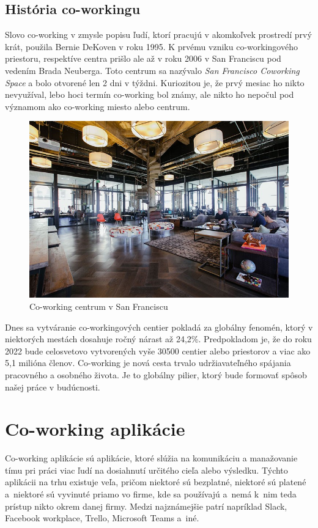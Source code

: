 \subsection{História co-workingu}
\indent Slovo co-working v zmysle popisu ľudí, ktorí pracujú v akomkoľvek prostredí prvý krát, použila Bernie DeKoven v roku 1995. K prvému vzniku co-workingového priestoru, respektíve centra prišlo ale až v roku 2006 v San Franciscu pod vedením Brada Neuberga. Toto centrum sa nazývalo \textit{San Francisco Coworking Space} a bolo otvorené len 2 dni v týždni. Kuriozitou je, že prvý mesiac ho nikto nevyužíval, lebo hoci termín co-working bol známy, ale nikto ho nepočul pod významom ako co-working miesto alebo centrum. 

\begin{figure}[H]
    \centering
    \includegraphics[scale=0.50]{img/coworking_space.jpg}
    \caption{Co-working centrum v San Franciscu}
    \label{fig:img-co-space}
\end{figure}

\indent Dnes sa vytváranie co-workingových centier pokladá za globálny fenomén, ktorý v niektorých mestách dosahuje ročný nárast až 24,2\%. Predpokladom je, že do roku 2022 bude celosvetovo vytvorených vyše 30500 centier alebo priestorov a viac ako 5,1 milióna členov. Co-working je nová cesta trvalo udržiavateľného spájania pracovného a osobného života. Je to globálny pilier, ktorý bude formovať spôsob našej práce v budúcnosti. 

\section{Co-working aplikácie}
\indent Co-working aplikácie sú aplikácie, ktoré slúžia na komunikáciu a manažovanie tímu pri práci viac ľudí na dosiahnutí určitého cieľa alebo výsledku. Týchto aplikácii na trhu existuje veľa, pričom niektoré sú bezplatné, niektoré sú platené a niektoré sú vyvinuté priamo vo firme, kde sa používajú a nemá k nim teda prístup nikto okrem danej firmy. Medzi najznámejšie patrí napríklad Slack, Facebook workplace, Trello, Microsoft Teams a iné.
 
